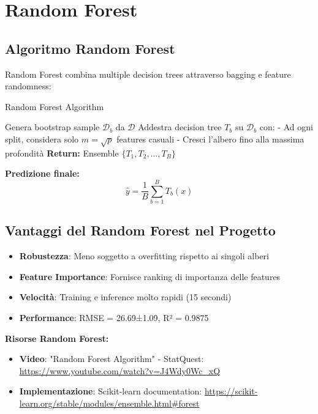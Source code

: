 \documentclass[12pt,a4paper,twoside]{report}
\begin{document}
\section{Random Forest}

\subsection{Algoritmo Random Forest}

Random Forest combina multiple decision trees attraverso bagging e feature randomness:

\begin{algorithm}
\caption{Random Forest Algorithm}
\begin{algorithmic}[1]
    \STATE Genera bootstrap sample $\mathcal{D}_b$ da $\mathcal{D}$
    \STATE Addestra decision tree $T_b$ su $\mathcal{D}_b$ con:
    \STATE \quad - Ad ogni split, considera solo $m = \sqrt{p}$ features casuali
    \STATE \quad - Cresci l'albero fino alla massima profondità
\ENDFOR
\STATE \textbf{Return:} Ensemble $\{T_1, T_2, \ldots, T_B\}$
\end{algorithmic}
\end{algorithm}

\textbf{Predizione finale:}
\begin{equation}
\hat{y} = \frac{1}{B} \sum_{b=1}^{B} T_b(x)
\end{equation}

\subsection{Vantaggi del Random Forest nel Progetto}
\begin{itemize}
    \item \textbf{Robustezza}: Meno soggetto a overfitting rispetto ai singoli alberi
    \item \textbf{Feature Importance}: Fornisce ranking di importanza delle features
    \item \textbf{Velocità}: Training e inference molto rapidi (15 secondi)
    \item \textbf{Performance}: RMSE = 26.69±1.09, R² = 0.9875
\end{itemize}

\textbf{Risorse Random Forest:}
\begin{itemize}
    \item \textbf{Video}: "Random Forest Algorithm" - StatQuest: \url{https://www.youtube.com/watch?v=J4Wdy0Wc_xQ}
    \item \textbf{Implementazione}: Scikit-learn documentation: \url{https://scikit-learn.org/stable/modules/ensemble.html#forest}
\end{itemize}
\end{document}
